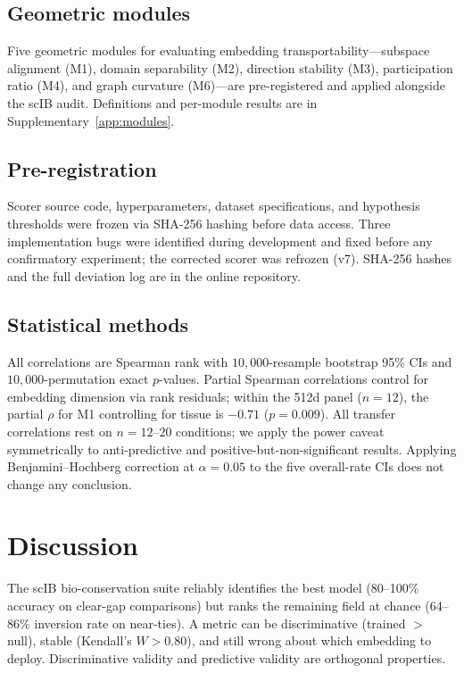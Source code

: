 \documentclass[11pt]{article}
\begin{document}
\subsection{Geometric modules}

Five geometric modules for evaluating embedding transportability---subspace alignment (M1), domain separability (M2), direction stability (M3), participation ratio (M4), and graph curvature (M6)---are pre-registered and applied alongside the scIB audit. Definitions and per-module results are in Supplementary~\ref{app:modules}.

\subsection{Pre-registration}

Scorer source code, hyperparameters, dataset specifications, and hypothesis thresholds were frozen via SHA-256 hashing before data access. Three implementation bugs were identified during development and fixed before any confirmatory experiment; the corrected scorer was refrozen (v7). SHA-256 hashes and the full deviation log are in the online repository.

\subsection{Statistical methods}

All correlations are Spearman rank with $10{,}000$-resample bootstrap 95\% CIs and $10{,}000$-permutation exact $p$-values. Partial Spearman correlations control for embedding dimension via rank residuals; within the 512d panel ($n = 12$), the partial $\rho$ for M1 controlling for tissue is $-0.71$ ($p = 0.009$). All transfer correlations rest on $n = 12$--$20$ conditions; we apply the power caveat symmetrically to anti-predictive and positive-but-non-significant results. Applying Benjamini--Hochberg correction at $\alpha = 0.05$ to the five overall-rate CIs does not change any conclusion.


\section{Discussion}
\label{sec:discussion}

The scIB bio-conservation suite reliably identifies the best model (80--100\% accuracy on clear-gap comparisons) but ranks the remaining field at chance (64--86\% inversion rate on near-ties). A metric can be discriminative (trained $>$ null), stable (Kendall's $W > 0.80$), and still wrong about which embedding to deploy. Discriminative validity and predictive validity are orthogonal properties.
\end{document}
